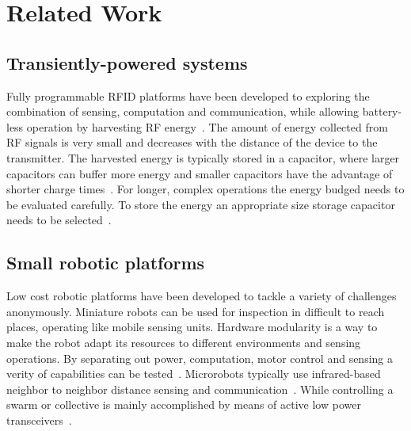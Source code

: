 \chapter{Related Work}
\label{chp:related_work}

\section{Transiently-powered systems}

Fully programmable RFID platforms have been developed to exploring the combination of sensing, computation and communication, while allowing battery-less operation by harvesting RF energy~\cite{sample_transim_2008}.
The amount of energy collected from RF signals is very small and decreases with the distance of the device to the transmitter.
The harvested energy is typically stored in a capacitor, where larger capacitors can buffer more energy and smaller capacitors have the advantage of shorter charge times~\cite{gummerson_mobisys_2010}.
For longer, complex operations the energy budged needs to be evaluated carefully.
To store the energy an appropriate size storage capacitor needs to be selected~\cite{naderiparizi_rfid_2015}.



\section{Small robotic platforms}

Low cost robotic platforms have been developed to tackle a variety of challenges anonymously.
Miniature robots can be used for inspection in difficult to reach places, operating like mobile sensing units.
Hardware modularity is a way to make the robot adapt its resources to different environments and sensing operations.
By separating out power, computation, motor control and sensing a verity of capabilities can be tested~\cite{sabelhaus_icra_2013, pickem_icra_2015, kim_iros_2016}.
Microrobots typically use infrared-based neighbor to neighbor distance sensing and communication~\cite{rubenstein_icra_2012, pickem_icra_2015, kim_iros_2016}.
While controlling a swarm or collective is mainly accomplished by means of active low power transceivers~\cite{sabelhaus_icra_2013, pickem_icra_2015, kim_iros_2016}. 

